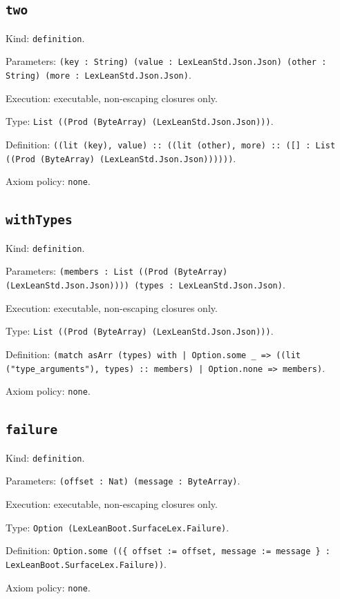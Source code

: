 \documentclass[11pt]{article}
\begin{document}
\subsection*{\texttt{two}}
\noindent Kind: \texttt{definition}.\par
\noindent Parameters: \texttt{(key : String) (value : LexLeanStd.Json.Json) (other : String) (more : LexLeanStd.Json.Json)}.\par
\noindent Execution: executable, non-escaping closures only.\par
\noindent Type: \texttt{List ((Prod (ByteArray) (LexLeanStd.Json.Json)))}.\par
\noindent Definition: \texttt{((lit (key), value) :: ((lit (other), more) :: ([] : List ((Prod (ByteArray) (LexLeanStd.Json.Json))))))}.\par
\noindent Axiom policy: \texttt{none}.\par
\subsection*{\texttt{withTypes}}
\noindent Kind: \texttt{definition}.\par
\noindent Parameters: \texttt{(members : List ((Prod (ByteArray) (LexLeanStd.Json.Json)))) (types : LexLeanStd.Json.Json)}.\par
\noindent Execution: executable, non-escaping closures only.\par
\noindent Type: \texttt{List ((Prod (ByteArray) (LexLeanStd.Json.Json)))}.\par
\noindent Definition: \texttt{(match asArr (types) with | Option.some \_ => ((lit ("type\_arguments"), types) :: members) | Option.none => members)}.\par
\noindent Axiom policy: \texttt{none}.\par
\subsection*{\texttt{failure}}
\noindent Kind: \texttt{definition}.\par
\noindent Parameters: \texttt{(offset : Nat) (message : ByteArray)}.\par
\noindent Execution: executable, non-escaping closures only.\par
\noindent Type: \texttt{Option (LexLeanBoot.SurfaceLex.Failure)}.\par
\noindent Definition: \texttt{Option.some ((\{ offset := offset, message := message \} : LexLeanBoot.SurfaceLex.Failure))}.\par
\noindent Axiom policy: \texttt{none}.\par
\end{document}
